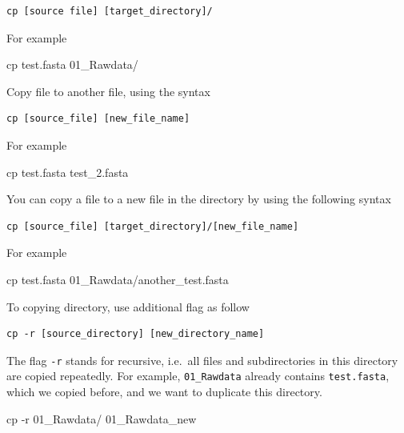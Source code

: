 \documentclass[
  letterpaper,
  DIV=11,
  numbers=noendperiod]{scrreprt}
\newenvironment{Shaded}{\begin{snugshade}}{\end{snugshade}}
\newcommand{\AttributeTok}[1]{\textcolor[rgb]{0.40,0.45,0.13}{#1}}
\newcommand{\FunctionTok}[1]{\textcolor[rgb]{0.28,0.35,0.67}{#1}}
\newcommand{\NormalTok}[1]{\textcolor[rgb]{0.00,0.23,0.31}{#1}}
\begin{document}
\begin{verbatim}
cp [source file] [target_directory]/
\end{verbatim}

For example

\begin{Shaded}
\begin{Highlighting}[]
\FunctionTok{cp}\NormalTok{ test.fasta 01\_Rawdata/}
\end{Highlighting}
\end{Shaded}

Copy file to another file, using the syntax

\begin{verbatim}
cp [source_file] [new_file_name]
\end{verbatim}

For example

\begin{Shaded}
\begin{Highlighting}[]
\FunctionTok{cp}\NormalTok{ test.fasta test\_2.fasta}
\end{Highlighting}
\end{Shaded}

You can copy a file to a new file in the directory by using the
following syntax

\begin{verbatim}
cp [source_file] [target_directory]/[new_file_name]
\end{verbatim}

For example

\begin{Shaded}
\begin{Highlighting}[]
\FunctionTok{cp}\NormalTok{ test.fasta 01\_Rawdata/another\_test.fasta}
\end{Highlighting}
\end{Shaded}

To copying directory, use additional flag as follow

\begin{verbatim}
cp -r [source_directory] [new_directory_name]
\end{verbatim}

The flag \texttt{-r} stands for recursive, i.e.~all files and
subdirectories in this directory are copied repeatedly. For example,
\texttt{01\_Rawdata} already contains \texttt{test.fasta}, which we
copied before, and we want to duplicate this directory.

\begin{Shaded}
\begin{Highlighting}[]
\FunctionTok{cp} \AttributeTok{{-}r}\NormalTok{ 01\_Rawdata/ 01\_Rawdata\_new}
\end{Highlighting}
\end{Shaded}
\end{document}
